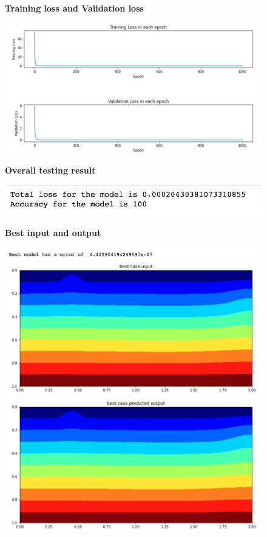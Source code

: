\begin{figure}[H]
    \textbf{Training loss and Validation loss}\par\medskip
    \includegraphics[scale=0.6]{Report LaTeX/figures/mantle_convection_images/ConvAE_trainingData.png}
\end{figure}

\begin{figure}[H]
    \textbf{Overall testing result}\par\medskip
    \includegraphics[scale=0.7]{Report LaTeX/figures/mantle_convection_images/ConvAE_OverallTesting.png}
\end{figure}

\begin{figure}[H]
    \textbf{Best input and output}\par\medskip
    \includegraphics[scale=0.4]{Report LaTeX/figures/mantle_convection_images/ConvAE_Best.png}
\end{figure}

